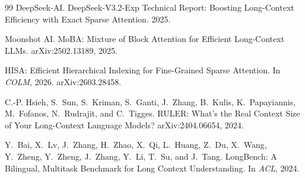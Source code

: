 \documentclass[11pt]{article}
\begin{document}
\begin{thebibliography}{99}
DeepSeek-AI. DeepSeek-V3.2-Exp Technical Report: Boosting Long-Context Efficiency with Exact Sparse Attention. 2025.

Moonshot AI. MoBA: Mixture of Block Attention for Efficient Long-Context LLMs. arXiv:2502.13189, 2025.

HISA: Efficient Hierarchical Indexing for Fine-Grained Sparse Attention. In \emph{COLM}, 2026. arXiv:2603.28458.

C.-P. Hsieh, S.~Sun, S.~Kriman, S.~Ganti, J.~Zhang, B.~Kulis, K.~Papayiannis, M.~Fofanos, N.~Rudrajit, and C.~Tigges. RULER: What's the Real Context Size of Your Long-Context Language Models? arXiv:2404.06654, 2024.

Y.~Bai, X.~Lv, J.~Zhang, H.~Zhao, X.~Qi, L.~Huang, Z.~Du, X.~Wang, Y.~Zheng, Y.~Zheng, J.~Zhang, Y.~Li, T.~Su, and J.~Tang. LongBench: A Bilingual, Multitask Benchmark for Long Context Understanding. In \emph{ACL}, 2024.
\end{thebibliography}
\end{document}
